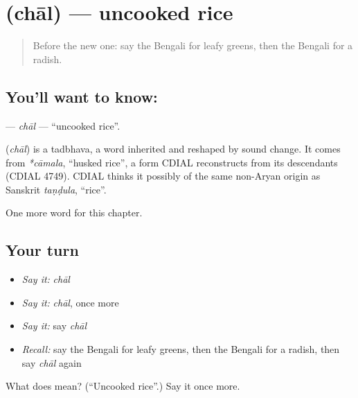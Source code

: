 \section[\texorpdfstring{\bn{চাল} (chāl)}{চাল (chāl)}]{ (chāl) — uncooked rice}

\label{lesson:BN-C117-chal}



\begin{quote}
Before the new one: say the Bengali for leafy greens, then the Bengali for a radish.
\end{quote}

\subsection*{You'll want to know: }
\textbf{} — \emph{chāl} — \textquotedblleft{}uncooked rice\textquotedblright{}.

\begin{cousinweb}
\textbf{} (\emph{chāl}) is a tadbhava, a word inherited and reshaped by sound change. It comes from \emph{*cāmala}, \textquotedblleft{}husked rice\textquotedblright{}, a form CDIAL reconstructs from its descendants (CDIAL 4749). CDIAL thinks it possibly of the same non-Aryan origin as Sanskrit \emph{taṇḍula}, \textquotedblleft{}rice\textquotedblright{}.
\end{cousinweb}

\begin{grammarlens}[title={What you've built}]
One more word for this chapter.
\end{grammarlens}

\subsection*{Your turn}
\begin{itemize}
\raggedright
  \item \emph{Say it:} \emph{chāl}
  \item \emph{Say it:} \emph{chāl}, once more
  \item \emph{Say it:} say \emph{chāl}
  \item \emph{Recall:} say the Bengali for leafy greens, then the Bengali for a radish, then say \emph{chāl} again
\end{itemize}

\begin{tcolorbox}[breakable,colback=teal!4,colframe=teal!35!black,title={Before you move on}]
What does  mean? (\textquotedblleft{}Uncooked rice\textquotedblright{}.) Say it once more.
\end{tcolorbox}
